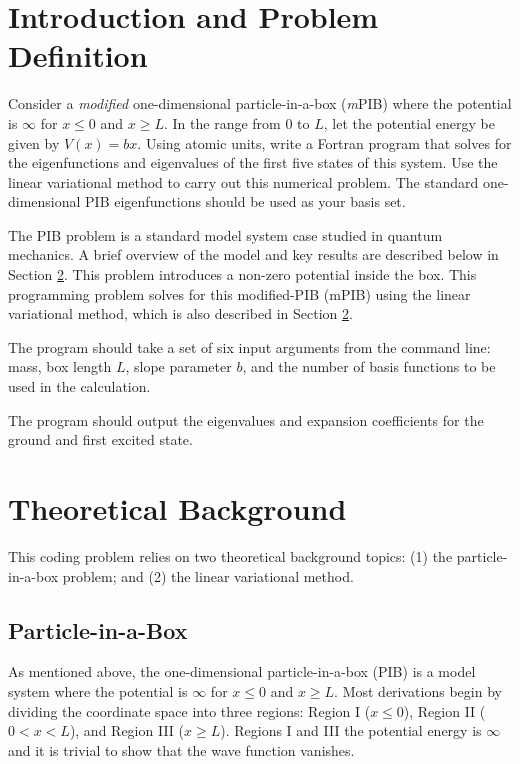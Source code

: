 \setdate{\today}
\setcounter{chapter}{1}
%

\makeheaderfooter{}
\maketitle
%
%
\section{Introduction and Problem Definition}
Consider a \emph{modified} one-dimensional particle-in-a-box (\emph{m}PIB) where the potential is $\infty$ for $x\le{}0$ and $x\ge{}L$. In the range from $0$ to $L$, let the potential energy be given by $V\left(x\right) = b x$. Using atomic units, write a Fortran program that solves for the eigenfunctions and eigenvalues of the first five states of this system. Use the linear variational method to carry out this numerical problem. The standard one-dimensional PIB eigenfunctions should be used as your basis set.

The PIB problem is a standard model system case studied in quantum mechanics. A brief overview of the model and key results are described below in Section \ref{Section:TheoreticalBackground}. This problem introduces a non-zero potential inside the box. This programming problem solves for this modified-PIB (mPIB) using the linear variational method, which is also described in Section \ref{Section:TheoreticalBackground}.

The program should take a set of six input arguments from the command line: mass, box length $L$, slope parameter $b$, and the number of basis functions to be used in the calculation.

The program should output the eigenvalues and expansion coefficients for the ground and first excited state.

%
\section{Theoretical Background}\label{Section:TheoreticalBackground}
This coding problem relies on two theoretical background topics: (1) the particle-in-a-box problem; and (2) the linear variational method.

\subsection{Particle-in-a-Box}
As mentioned above, the one-dimensional particle-in-a-box (PIB) is a model system where the potential is $\infty$ for $x \le{}0$ and $x \ge{} L$. Most derivations begin by dividing the coordinate space into three regions: Region I ($x\le{}0$), Region II ($0<x<L$), and Region III ($x\ge{}L$). Regions I and III the potential energy is $\infty$ and it is trivial to show that the wave function vanishes.

